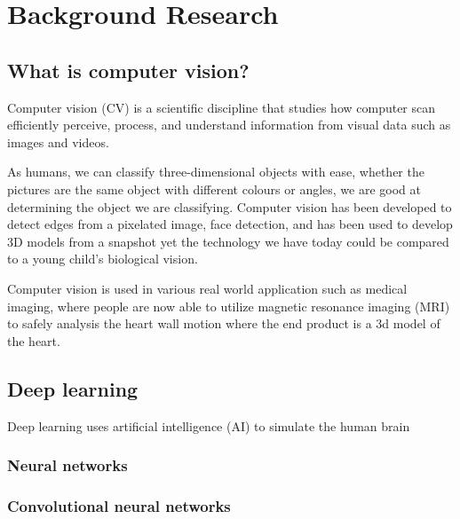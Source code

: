 \documentclass[12pt]{report}
\begin{document}
\thispagestyle{empty}   %

\tableofcontents

\chapter{Background Research}


\section{What is computer vision?}


Computer vision (CV) is a scientific discipline that studies how computer scan efficiently perceive, process, and understand information from visual data such as images and videos.

As humans, we can classify three-dimensional objects with ease, whether the pictures are the same object with different colours or angles, we are good at determining the object we are classifying. 
Computer vision has been developed to detect edges from a pixelated image, face detection, and has been used to develop 3D models from a snapshot yet the technology we have today could be compared to a young child's biological vision. 

Computer vision is used in various real world application such as medical imaging, where people are now able to utilize magnetic resonance imaging (MRI) to safely analysis the heart wall motion where the end product is a 3d model of the heart.


\section{Deep learning}

Deep learning uses artificial intelligence (AI) to simulate the human brain

\subsection{Neural networks}

\subsection{Convolutional neural networks}
\end{document}

